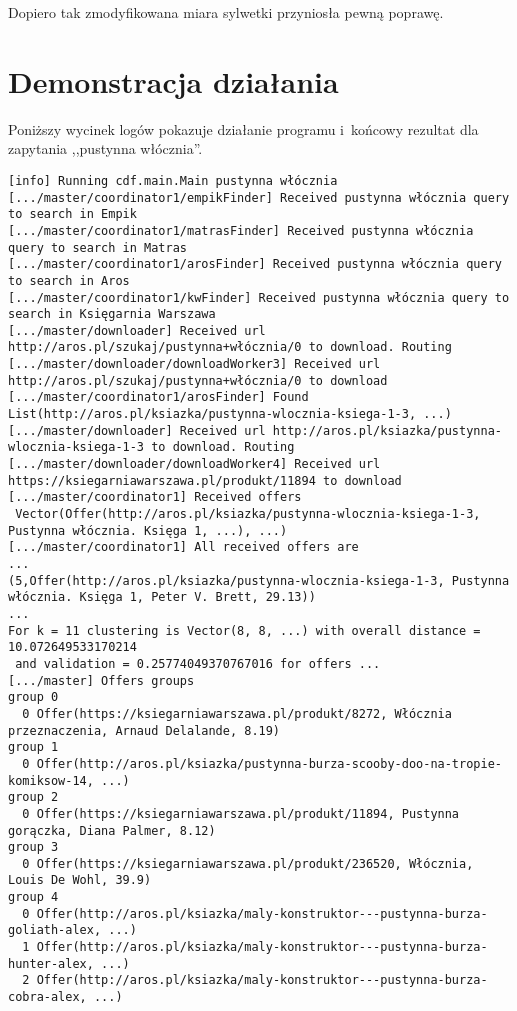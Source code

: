 \documentclass[a4paper,12pt]{mwart}
\begin{document}
Dopiero tak zmodyfikowana miara sylwetki przyniosła pewną poprawę.

\section{Demonstracja działania}

Poniższy wycinek logów pokazuje działanie programu i~końcowy rezultat dla
zapytania ,,pustynna włócznia''.

\scriptsize
\begin{verbatim}
[info] Running cdf.main.Main pustynna włócznia
[.../master/coordinator1/empikFinder] Received pustynna włócznia query to search in Empik
[.../master/coordinator1/matrasFinder] Received pustynna włócznia query to search in Matras
[.../master/coordinator1/arosFinder] Received pustynna włócznia query to search in Aros
[.../master/coordinator1/kwFinder] Received pustynna włócznia query to search in Księgarnia Warszawa
[.../master/downloader] Received url http://aros.pl/szukaj/pustynna+włócznia/0 to download. Routing
[.../master/downloader/downloadWorker3] Received url http://aros.pl/szukaj/pustynna+włócznia/0 to download
[.../master/coordinator1/arosFinder] Found List(http://aros.pl/ksiazka/pustynna-wlocznia-ksiega-1-3, ...)
[.../master/downloader] Received url http://aros.pl/ksiazka/pustynna-wlocznia-ksiega-1-3 to download. Routing
[.../master/downloader/downloadWorker4] Received url https://ksiegarniawarszawa.pl/produkt/11894 to download
[.../master/coordinator1] Received offers
 Vector(Offer(http://aros.pl/ksiazka/pustynna-wlocznia-ksiega-1-3, Pustynna włócznia. Księga 1, ...), ...)
[.../master/coordinator1] All received offers are
...
(5,Offer(http://aros.pl/ksiazka/pustynna-wlocznia-ksiega-1-3, Pustynna włócznia. Księga 1, Peter V. Brett, 29.13))
...
For k = 11 clustering is Vector(8, 8, ...) with overall distance = 10.072649533170214
 and validation = 0.25774049370767016 for offers ...
[.../master] Offers groups
group 0
  0 Offer(https://ksiegarniawarszawa.pl/produkt/8272, Włócznia przeznaczenia, Arnaud Delalande, 8.19)
group 1
  0 Offer(http://aros.pl/ksiazka/pustynna-burza-scooby-doo-na-tropie-komiksow-14, ...)
group 2
  0 Offer(https://ksiegarniawarszawa.pl/produkt/11894, Pustynna gorączka, Diana Palmer, 8.12)
group 3
  0 Offer(https://ksiegarniawarszawa.pl/produkt/236520, Włócznia, Louis De Wohl, 39.9)
group 4
  0 Offer(http://aros.pl/ksiazka/maly-konstruktor---pustynna-burza-goliath-alex, ...)
  1 Offer(http://aros.pl/ksiazka/maly-konstruktor---pustynna-burza-hunter-alex, ...)
  2 Offer(http://aros.pl/ksiazka/maly-konstruktor---pustynna-burza-cobra-alex, ...)

\end{verbatim}
\end{document}
